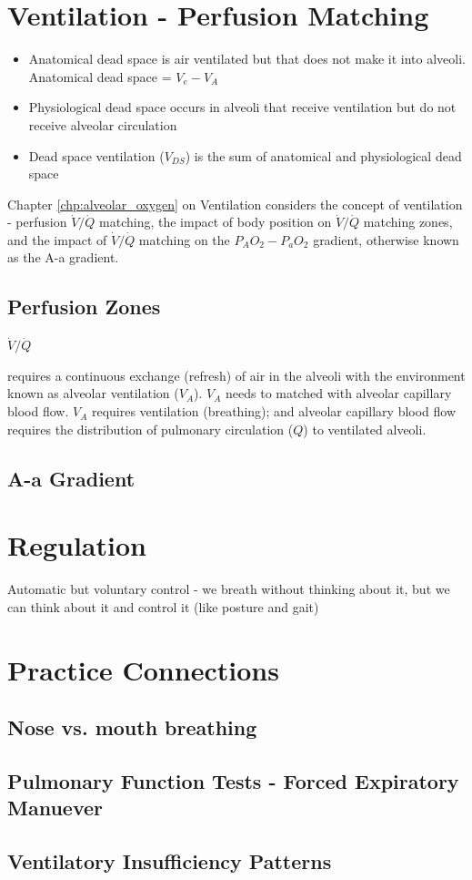 \section{Ventilation - Perfusion Matching}

\begin{itemize}
       \item Anatomical dead space is air ventilated but that does not make it into alveoli. Anatomical dead space = $V_e - V_A$
    \item Physiological dead space occurs in alveoli that receive ventilation but do not receive alveolar circulation
    \item Dead space ventilation ($V_{DS}$) is the sum of anatomical and physiological dead space
\end{itemize}


Chapter \ref{chp:alveolar_oxygen} on Ventilation considers the concept of ventilation - perfusion $\dot{V}/\dot{Q}$ matching, the impact of body position on $\dot{V}/\dot{Q}$ matching zones, and the impact of $\dot{V}/\dot{Q}$ matching on the $P_AO_2-P_aO_2$ gradient, otherwise known as the A-a gradient.
\subsection{Perfusion Zones}
$\dot{V}/\dot{Q}$

requires a continuous exchange (refresh) of air in the alveoli with the environment known as alveolar ventilation ($V_A$). $V_A$ needs to matched with alveolar capillary blood flow. $V_A$ requires ventilation (breathing); and alveolar capillary blood flow requires the distribution of pulmonary circulation ($Q$) to ventilated alveoli. 


\subsection{A-a Gradient}


\section{Regulation}

Automatic but voluntary control - we breath without thinking about it, but we can think about it and control it (like posture and gait)



\section{Practice Connections}

\subsection{Nose vs. mouth breathing}

\subsection{Pulmonary Function Tests - Forced Expiratory Manuever}

\subsection{Ventilatory Insufficiency Patterns}

\printbibliography[heading=subbibintoc]